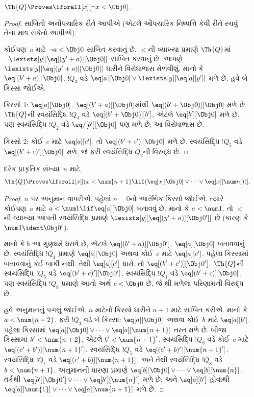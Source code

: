\begin{lem}
$\Th{Q} \Proves \lforall[x][\lnot x < \Obj 0]$.
\end{lem}

\begin{proof}
સાબિતી અનૌપચારિક રીતે આપીએ
(એટલે ઔપચારિક નિષ્પત્તિ
કેવી રીતે રચવું તેના માત્ર સંકેતો
આપીએ).

કોઈપણ~$a$ માટે $\lnot a < \Obj 0$
સાબિત કરવાનું છે. $<$ની
વ્યાખ્યા પ્રમાણે $\Th{Q}$માં
$\lnot \lexists[y][\eq[(y'+a)][\Obj 0]]$
સાબિત કરવાનું છે. આપણે
$\lexists[y][\eq[(y'+a)][\Obj 0]]$
ધારીને વિરોધાભાસ મેળવીશું.
માનો કે $\eq[(b'+a)][\Obj 0]$.
$!Q_3$ વડે
$\eq[a][\Obj 0] \lor \lexists[y][\eq[a][y']]$
મળે છે. હવે બે કિસ્સા જોઈએ.

કિસ્સો 1: $\eq[a][\Obj 0]$.
$\eq[(b'+a)][\Obj 0]$માંથી
$\eq[(b' + \Obj 0)][\Obj 0]$
મળે છે. $\Th{Q}$ની સ્વયંસિદ્ધિ
$!Q_4$ વડે
$\eq[(b' + \Obj 0)][b']$,
એટલે $\eq[b'][\Obj 0]$ મળે છે.
પણ સ્વયંસિદ્ધિ $!Q_2$ વડે
$\eq/[b'][\Obj 0]$ પણ મળે છે;
આ વિરોધાભાસ છે.

કિસ્સો 2: કોઈ~$c$ માટે
$\eq[a][c']$. તો
$\eq[(b' + c')][\Obj 0]$ મળે છે.
સ્વયંસિદ્ધિ $!Q_5$ વડે
$\eq[(b' + c)'][\Obj 0]$ મળે,
જે ફરી સ્વયંસિદ્ધિ $Q_2$ની
વિરુદ્ધ છે.
\end{proof}

\begin{lem}
દરેક પ્રાકૃતિક સંખ્યા~$n$ માટે,
  \[
  \Th{Q} \Proves
  \lforall[x][(x < \num {n+1} \lif (\eq[x][\Obj 0] \lor \dots \lor
    \eq[x][\num n]))].
  \]
\end{lem}

\begin{proof}
$n$ પર અનુમાન વાપરીએ.
પહેલાં $n = 0$નો આરંભિક
કિસ્સો જોઈએ. ત્યારે કોઈપણ~$a$
માટે $a < \num 1 \lif
\eq[a][\Obj 0]$ બતાવવું છે.
માનો કે $a < \num 1$. તો
$<$ની વ્યાખ્યા આપતી સ્વયંસિદ્ધિ
પ્રમાણે
$\lexists[y][\eq[(y'+a)][\Obj 0']]$
છે (કારણ કે $\num 1 \ident
\Obj 0'$).

માનો કે $b$ આ ગુણધર્મ
ધરાવે છે, એટલે
$\eq[(b'+a)][\Obj 0']$.
$\eq[a][\Obj 0]$ બતાવવાનું છે.
સ્વયંસિદ્ધિ $!Q_3$ પ્રમાણે
$\eq[a][\Obj 0]$ અથવા
કોઈ~$c$ માટે $\eq[a][c']$.
પહેલા કિસ્સામાં બતાવવાનું કંઈ
બાકી નથી. તેથી
$\eq[a][c']$ ધારો. તો
$\eq[(b' + c')][\Obj 0']$.
$\Th{Q}$ની સ્વયંસિદ્ધિ $!Q_5$
વડે $\eq[(b'+c)'][\Obj 0']$.
સ્વયંસિદ્ધિ $!Q_1$ વડે
$\eq[(b' + c)][\Obj 0]$.
પણ સ્વયંસિદ્ધિ $!Q_8$ પ્રમાણે
આનો અર્થ $c < \Obj 0$ છે,
જે થી
મળેલા પરિણામની વિરુદ્ધ છે.

હવે અનુમાનનું પગલું જોઈએ.
$n$ માટેનો કિસ્સો ધારીને
$n+1$ માટે સાબિત કરીએ.
માનો કે $a < \num {n+2}$.
ફરી $!Q_3$ વડે બે કિસ્સા:
$\eq[a][\Obj 0]$ અથવા
કોઈ~$b$ માટે $\eq[a][b']$.
પહેલા કિસ્સામાં
$\eq[a][\Obj 0] \lor \dots \lor
\eq[a][\num{n+1}]$ તરત મળે છે.
બીજા કિસ્સામાં
$b' < \num {n+2}$, એટલે
$b' < \num{n+1}'$.
સ્વયંસિદ્ધિ $!Q_8$ વડે કોઈ~$c$
માટે
$\eq[(c'+b')][\num{n+1}']$.
સ્વયંસિદ્ધિ $!Q_5$ વડે
$\eq[(c'+b)'][\num{n+1}']$.
સ્વયંસિદ્ધિ $!Q_1$ વડે
$\eq[(c'+b)][\num{n+1}]$,
અને તેથી સ્વયંસિદ્ધિ $!Q_8$
વડે $b < \num{n+1}$.
અનુમાનની ધારણા પ્રમાણે
$\eq[b][\Obj 0] \lor \dots \lor
\eq[b][\num{n}]$. તર્કથી
$\eq[b'][\Obj 0'] \lor \dots \lor
\eq[b'][\num{n}']$ મળે છે;
અને $\eq[a][b']$ હોવાથી
$\eq[a][\num{1}] \lor \dots \lor
\eq[a][\num{n+1}]$ મળે છે.
\end{proof}

